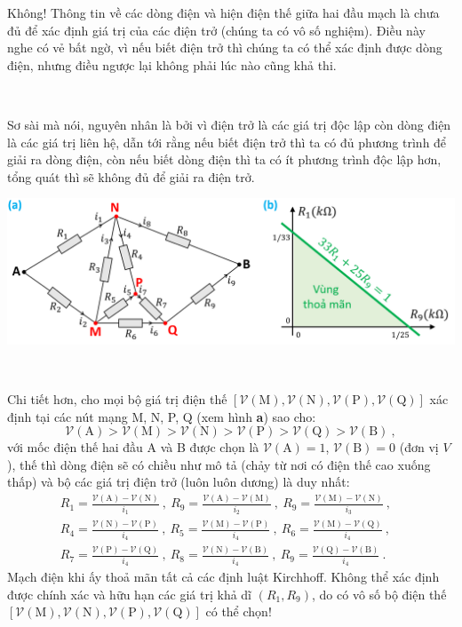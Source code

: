 Không! Thông tin về các dòng điện và hiện điện thế giữa hai đầu mạch là chưa đủ để xác định giá trị của các điện trở (chúng ta có vô số nghiệm). Điều này nghe có vẻ bất ngờ, vì nếu biết điện trở thì chúng ta có thể xác định được dòng điện, nhưng điều ngược lại không phải lúc nào cũng khả thi. 

\ \ 

Sơ sài mà nói, nguyên nhân là bởi vì điện trở là các giá trị độc lập còn dòng điện là các giá trị liên hệ, dẫn tới rằng nếu biết điện trở thì ta có đủ phương trình để giải ra dòng điện, còn nếu biết dòng điện thì ta có ít phương trình độc lập hơn, tổng quát thì sẽ không đủ để giải ra điện trở. 

\begin{center}
\includegraphics[width=\textwidth,keepaspectratio]{Problem_2/Figs/S2A.png}
\end{center}

\ \ 

Chi tiết hơn, cho mọi bộ giá trị điện thế $[\mathcal{V}(\text{M}),\mathcal{V}(\text{N}),\mathcal{V}(\text{P}),\mathcal{V}(\text{Q})]$ xác định tại các nút mạng M, N, P, Q (xem hình \textbf{a}) sao cho:
\begin{equation}
\mathcal{V}(\text{A}) > \mathcal{V}(\text{M}) > \mathcal{V}(\text{N}) > \mathcal{V}(\text{P}) > \mathcal{V}(\text{Q}) > \mathcal{V}(\text{B})   \ ,
\end{equation}
với mốc điện thế hai đầu A và B được chọn là $\mathcal{V}(\text{A})=1$, $\mathcal{V}(\text{B})=0$ (đơn vị $V$), thế thì dòng điện sẽ có chiều như mô tả (chảy từ nơi có điện thế cao xuống thấp) và bộ các giá trị điện trở (luôn luôn dương) là duy nhất:
\begin{equation}
\begin{split}
R_1 = \frac{\mathcal{V}(\text{A})-\mathcal{V}(\text{N})}{i_1} \ , \ R_9 = \frac{\mathcal{V}(\text{A})-\mathcal{V}(\text{M})}{i_2} \ , \ R_9 = \frac{\mathcal{V}(\text{M})-\mathcal{V}(\text{N})}{i_3} \ , & 
\\
R_4 = \frac{\mathcal{V}(\text{N})-\mathcal{V}(\text{P})}{i_4} \ , \ R_5 = \frac{\mathcal{V}(\text{M})-\mathcal{V}(\text{P})}{i_4} \ , \ R_6 = \frac{\mathcal{V}(\text{M})-\mathcal{V}(\text{Q})}{i_4} \ , &
\\
R_7 = \frac{\mathcal{V}(\text{P})-\mathcal{V}(\text{Q})}{i_4} \ , \ R_8 = \frac{\mathcal{V}(\text{N})-\mathcal{V}(\text{B})}{i_4} \ , \ R_9 = \frac{\mathcal{V}(\text{Q})-\mathcal{V}(\text{B})}{i_4} \ . 
\end{split}
\end{equation}
Mạch điện khi ấy thoả mãn tất cả các định luật Kirchhoff. Không thể xác định được chính xác và hữu hạn các giá trị khả dĩ $(R_1,R_9)$, do có vô số bộ điện thế $[\mathcal{V}(\text{M}),\mathcal{V}(\text{N}),\mathcal{V}(\text{P}),\mathcal{V}(\text{Q})]$ có thể chọn!

